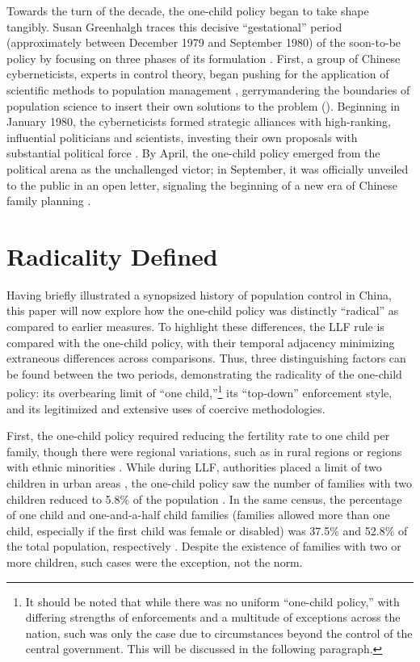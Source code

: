 \documentclass[12pt, a4paper, twoside]{article}
\begin{document}
Towards the turn of the decade, the one-child policy began to take shape tangibly. Susan Greenhalgh traces this decisive “gestational” period (approximately between December 1979 and September 1980) of the soon-to-be policy by focusing on three phases of its formulation \autocite[p.\ 198]{Greenhalgh2008JustOneChild}. First, a group of Chinese cyberneticists, experts in control theory, began pushing for the application of scientific methods to population management \autocite[pp.\ 211--223]{Greenhalgh2008JustOneChild}, gerrymandering the boundaries of population science to insert their own solutions to the problem (\cites[p.\ 195]{Greenhalgh2008JustOneChild}[pp.\ 1--35]{Gieryn1999}). Beginning in January 1980, the cyberneticists formed strategic alliances with high-ranking, influential politicians and scientists, investing their own proposals with substantial political force \autocite[chap.\ 7]{Greenhalgh2008JustOneChild}. By April, the one-child policy emerged from the political arena as the unchallenged victor; in September, it was officially unveiled to the public in an open letter, signaling the beginning of a new era of Chinese family planning \autocite[pp.\ 298--299]{Greenhalgh2008JustOneChild}.

\section{Radicality Defined}

Having briefly illustrated a synopsized history of population control in China, this paper will now explore how the one-child policy was distinctly “radical” as compared to earlier measures. To highlight these differences, the LLF rule is compared with the one-child policy, with their temporal adjacency minimizing extraneous differences across comparisons. Thus, three distinguishing factors can be found between the two periods, demonstrating the radicality of the one-child policy: its overbearing limit of “one child,”\footnote{It should be noted that while there was no uniform “one-child policy,” with differing strengths of enforcements and a multitude of exceptions across the nation, such was only the case due to circumstances beyond the control of the central government. This will be discussed in the following paragraph.} its “top-down” enforcement style, and its legitimized and extensive uses of coercive methodologies.

First, the one-child policy required reducing the fertility rate to one child per family, though there were regional variations, such as in rural regions or regions with ethnic minorities \autocite[pp.\ 373--387]{ShortZhai1998}. While during LLF, authorities placed a limit of two children in urban areas \autocite[p.\ 586]{BongaartsGreenhalgh1985}, the one-child policy saw the number of families with two children reduced to 5.8\% of the population \autocite{Xinhua2013BackgroundBirthPolicy}. In the same census, the percentage of one child and one-and-a-half child families (families allowed more than one child, especially if the first child was female or disabled) was 37.5\% and 52.8\% of the total population, respectively \autocite{Xinhua2013BackgroundBirthPolicy}. Despite the existence of families with two or more children, such cases were the exception, not the norm.
\end{document}
